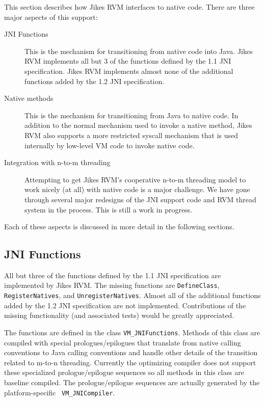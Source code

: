 
This section describes how Jikes RVM interfaces to native code. There
are three major aspects of this support:
\begin{description}
\item [JNI Functions] This is the mechanism for transitioning from
native code into Java. Jikes RVM implements all but 3 of the
functions defined by the 1.1 JNI specification. Jikes RVM implements
almost none of the additional functions added by the 1.2 JNI
specification.
\item [Native methods] This is the mechanism for transitioning from
Java to native code. In addition to the normal mechanism used to
invoke a native method, Jikes RVM also supports a more restricted
syscall mechanism that is used internally by low-level VM code to
invoke native code. 
\item [Integration with n-to-m threading] Attempting to get Jikes RVM's
cooperative n-to-m threading model to work nicely (at all) with native
code is a major challenge. We have gone through several major
redesigns of the JNI support code and RVM thread system in the
process. This is still a work in progress.
\end{description}
Each of these aspects is discussed in more detail in the following
sections. 

\subsection{JNI Functions}
All but three of the functions defined by the 1.1 JNI specification are
implemented by Jikes RVM. The missing functions are {\tt DefineClass},
{\tt RegisterNatives}, and {\tt UnregisterNatives}.  Almost all of the
additional functions added by the 1.2 JNI specification are not
implemented.  Contributions of the missing functionality (and
associated tests) would be greatly appreciated. 

The functions are defined in the class {\tt VM\_JNIFunctions}. Methods
of this class are compiled with special prologues/epilogues that
translate from native calling conventions to Java calling conventions
and handle other details of the transition related to m-to-n
threading.  Currently the optimizing compiler 
does not support these specialized prologue/epilogue sequences so all
methods in this class are baseline compiled.  The prologue/epilogue
sequences are actually generated by the platform-specific {\tt
VM\_JNICompiler}. 

